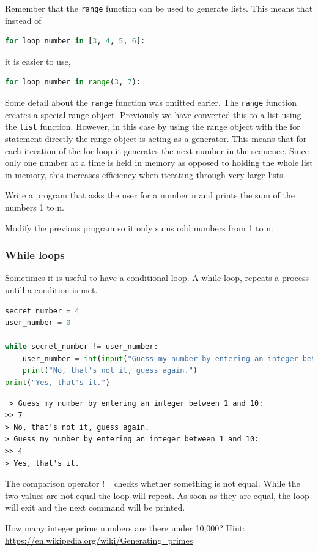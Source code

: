 Remember that the \texttt{range} function can be used to generate lists. This means that instead of 
\begin{lstlisting}[language=Python]
for loop_number in [3, 4, 5, 6]:
\end{lstlisting}
		it is easier to use,
\begin{lstlisting}[language=Python]
for loop_number in range(3, 7):
\end{lstlisting}
Some detail about the \texttt{range} function was omitted earier. The \texttt{range} function creates a special range object. Previously we have converted this to a list using the \texttt{list} function. However, in this case by using the range object with the for statement directly the range object is acting as a generator. This means that for each iteration of the for loop it generates the next number in the sequence. Since only one number at a time is held in memory as opposed to holding the whole list in memory, this increases efficiency when iterating through very large lists.

		\begin{task}Write a program that asks the user for a number n and prints the sum of the numbers 1 to n.\end{task}
		\begin{task}Modify the previous program so it only sums odd numbers from 1 to n.\end{task}
		\subsubsection{While loops}
		Sometimes it is useful to have a conditional loop. A while loop, repeats a process untill a condition is met.
\begin{lstlisting}[language=Python]
secret_number = 4
user_number = 0

while secret_number != user_number:
	user_number = int(input("Guess my number by entering an integer between 1 and 10: "
	print("No, that's not it, guess again.")
print("Yes, that's it.")\end{lstlisting}
		\begin{verbatim} > Guess my number by entering an integer between 1 and 10: 
>> 7
> No, that's not it, guess again.
> Guess my number by entering an integer between 1 and 10:
>> 4
> Yes, that's it.\end{verbatim}
		The comparison operator != checks whether something is not equal. While the two values are not equal the loop will repeat. As soon as they are equal, the loop will exit and the next command will be printed.
\begin{advancedtask}How many integer prime numbers are there under 10,000? Hint: \url{https://en.wikipedia.org/wiki/Generating_primes}\end{advancedtask}

